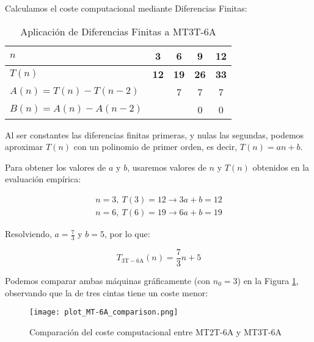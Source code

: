 Calculamos el coste computacional mediante Diferencias Finitas:

\begin{table}[H]
    \centering
    \begin{tabular}{|l|c|c|c|c|}
        \hline
        $n$    & \textbf{3}  & \textbf{6}  & \textbf{9}  & \textbf{12} \\ \hline
        $T(n)$ & \textbf{12} & \textbf{19} & \textbf{26} & \textbf{33} \\ \hline
        \hline
        $A(n) = T(n) - T(n-2)$ &   & 7 & 7 & 7 \\ \hline
        $B(n) = A(n) - A(n-2)$ &   &   & 0 & 0 \\ \hline
    \end{tabular}
    \caption{Aplicación de Diferencias Finitas a MT3T-6A}
\end{table}

Al ser constantes las diferencias finitas primeras, y nulas las segundas, podemos aproximar $T(n)$ con un polinomio de primer orden, es decir, $T(n) = an + b$.\medskip

Para obtener los valores de $a$ y $b$, usaremos valores de $n$ y $T(n)$ obtenidos en la evaluación empírica:

\begin{subequations}
    \begin{gather*}
        n = 3,\ T(3) = 12 \rightarrow 3a + b = 12 \\
        n = 6,\ T(6) = 19 \rightarrow 6a + b = 19
    \end{gather*}
\end{subequations}

Resolviendo, $a=\frac{7}{3}$ y $b=5$, por lo que:

\begin{equation}
    T_{\mathrm{3T-6A}}(n) = \frac{7}{3}n + 5
\end{equation}

Podemos comparar ambas máquinas gráficamente (con $n_0 = 3$) en la Figura \ref{fig:MT-6A}, observando que la de tres cintas tiene un coste menor:

\begin{figure}[H]
    \centering
    \texttt{[image: plot\_MT-6A\_comparison.png]}
    \caption{Comparación del coste computacional entre MT2T-6A y MT3T-6A}
    \label{fig:MT-6A}
\end{figure}




